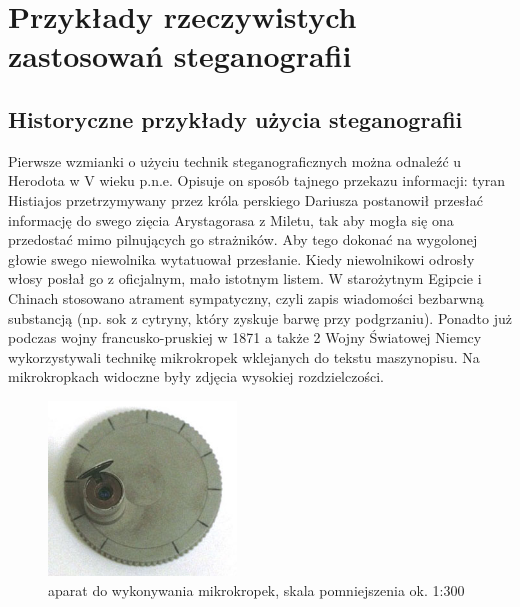 \documentclass{article}
\begin{document}
\section{Przykłady rzeczywistych zastosowań steganografii}
\subsection{Historyczne przykłady użycia steganografii}
Pierwsze wzmianki o użyciu technik steganograficznych można odnaleźć u Herodota w V wieku p.n.e.   Opisuje on sposób tajnego przekazu informacji: tyran Histiajos przetrzymywany przez króla perskiego Dariusza postanowił przesłać informację do swego zięcia Arystagorasa z Miletu, tak aby mogła się ona przedostać mimo pilnujących go strażników. Aby tego dokonać na wygolonej głowie swego niewolnika wytatuował przesłanie. Kiedy niewolnikowi odrosły włosy posłał go z oficjalnym, mało istotnym listem. W starożytnym Egipcie i Chinach stosowano atrament sympatyczny, czyli
zapis wiadomości bezbarwną substancją (np. sok z cytryny, który zyskuje barwę przy podgrzaniu). Ponadto już podczas wojny francusko-pruskiej w 1871 a także 2 Wojny Światowej Niemcy wykorzystywali technikę mikrokropek wklejanych
do tekstu maszynopisu. Na mikrokropkach widoczne były zdjęcia wysokiej rozdzielczości.
\begin{figure}[H]
	\centering
	\includegraphics[width=5cm]{mikrokropkowiec}
	\caption{aparat do wykonywania mikrokropek, skala pomniejszenia ok. 1:300}
\end{figure}
\end{document}
